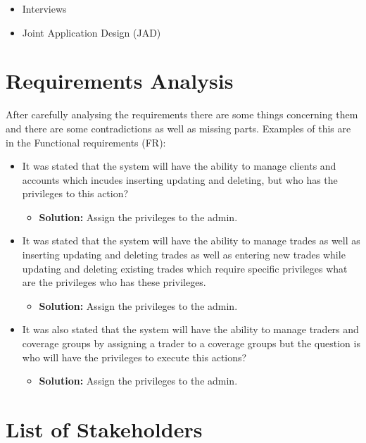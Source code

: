 \documentclass[a4paper]{report}
\begin{document}
\begin{itemize}
    \item Interviews
    \item Joint Application Design (JAD)
\end{itemize}

\chapter{Requirements Analysis}

After carefully analysing the requirements there are some things concerning them and there are some contradictions as well as missing parts. Examples of this are in the Functional requirements (FR):

\begin{itemize}
    \item It was stated that the system will have the ability to manage clients and accounts which incudes inserting updating and deleting, but who has the privileges to this action?
          \begin{itemize}
              \item \textbf{Solution:} Assign the privileges to the admin.
          \end{itemize}
    \item It was stated that the system will have the ability to manage trades as well as inserting updating and deleting trades as well as entering new trades while updating and deleting existing trades which require specific privileges what are the privileges who has these privileges.
          \begin{itemize}
              \item \textbf{Solution:} Assign the privileges to the admin.
          \end{itemize}
    \item It was also stated that the system will have the ability to manage traders and coverage groups by assigning a trader to a coverage groups but the question is who will have the privileges to execute this actions?
          \begin{itemize}
              \item \textbf{Solution:} Assign the privileges to the admin.
          \end{itemize}
\end{itemize}


\chapter{List of Stakeholders}
\end{document}
